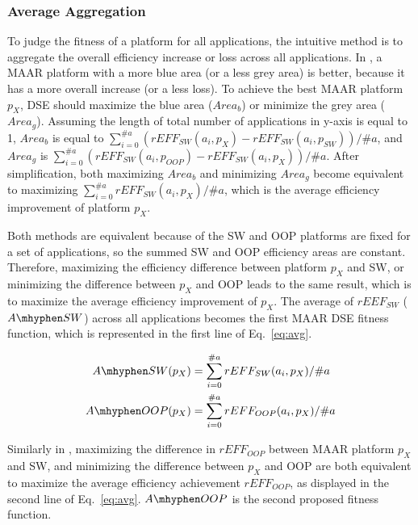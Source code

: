 \subsubsection{Average Aggregation}

To judge the fitness of a platform for all applications, the intuitive method is to aggregate the overall efficiency increase or loss across all applications.
In , a MAAR platform with a more blue area (or a less grey area) is better, because it has a more overall increase (or a less loss). 
To achieve the best MAAR platform $p_{X}$, DSE should maximize the blue area ($Area_{b}$) or minimize the grey area ($Area_{g}$). 
Assuming the length of total number of applications in y-axis is equal to 1, 
$Area_{b}$ is equal to $\sum_{i=0}^{\#a} ( rEFF_{SW}(a_{i}, p_{X}) -  rEFF_{SW}(a_{i}, p_{SW}) ) / \#a $, and $Area_{g}$ is $\sum_{i=0}^{\#a} ( rEFF_{SW}(a_{i}, p_{OOP}) -  rEFF_{SW}(a_{i}, p_{X}) ) / \#a $.
After simplification, both maximizing $Area_b$ and minimizing $Area_g$ become equivalent to maximizing $\sum_{i=0}^{\#a} rEFF_{SW}(a_{i}, p_{X}) / \#a$, which is the average efficiency improvement of platform $p_{X}$.  

Both methods are equivalent because of the SW and OOP platforms are fixed for a set of applications, so the summed SW and OOP efficiency areas are constant. 
Therefore, maximizing the efficiency difference between platform $p_{X}$ and SW, or minimizing the difference between $p_{X}$ and OOP leads to the same result, which is to maximize the average efficiency improvement of $p_{X}$. 
The average of $rEEF_{SW}$ ($A \mhyphen SW$) across all applications becomes the first MAAR DSE fitness function, which is represented in the first line of Eq.~\eqref{eq:avg}.

\vspace{-8pt}
\begin{equation}
\begin{split}
	A\mhyphen SW (p_{X}) &= \sum_{i=0}^{\#a} rEFF_{SW}(a_{i}, p_{X}) / \#a \\
	A\mhyphen OOP (p_{X}) &= \sum_{i=0}^{\#a} rEFF_{OOP}(a_{i}, p_{X}) / \#a
\label{eq:avg}
\end{split}
\end{equation}

Similarly in , maximizing the difference in $rEFF_{OOP}$ between MAAR platform $p_{X}$ and SW, and minimizing the difference between $p_{X}$ and OOP are both equivalent to maximize the average efficiency achievement $rEFF_{OOP}$, as displayed in the second line of Eq.~\eqref{eq:avg}. $A \mhyphen OOP$ is the second proposed fitness function.